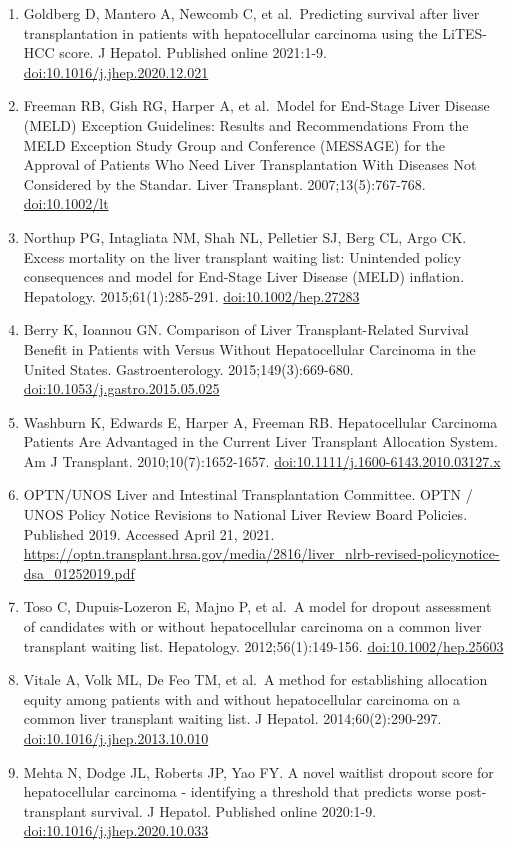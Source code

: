 \documentclass[11pt,english,]{book} %
\begin{document}
\begin{enumerate}
\item
  Goldberg D, Mantero A, Newcomb C, et al.~Predicting survival after liver transplantation in patients with hepatocellular carcinoma using the LiTES-HCC score. J Hepatol. Published online 2021:1-9. \url{doi:10.1016/j.jhep.2020.12.021}
\item
  Freeman RB, Gish RG, Harper A, et al.~Model for End-Stage Liver Disease (MELD) Exception Guidelines: Results and Recommendations From the MELD Exception Study Group and Conference (MESSAGE) for the Approval of Patients Who Need Liver Transplantation With Diseases Not Considered by the Standar. Liver Transplant. 2007;13(5):767-768. \url{doi:10.1002/lt}
\item
  Northup PG, Intagliata NM, Shah NL, Pelletier SJ, Berg CL, Argo CK. Excess mortality on the liver transplant waiting list: Unintended policy consequences and model for End-Stage Liver Disease (MELD) inflation. Hepatology. 2015;61(1):285-291. \url{doi:10.1002/hep.27283}
\item
  Berry K, Ioannou GN. Comparison of Liver Transplant-Related Survival Benefit in Patients with Versus Without Hepatocellular Carcinoma in the United States. Gastroenterology. 2015;149(3):669-680. \url{doi:10.1053/j.gastro.2015.05.025}
\item
  Washburn K, Edwards E, Harper A, Freeman RB. Hepatocellular Carcinoma Patients Are Advantaged in the Current Liver Transplant Allocation System. Am J Transplant. 2010;10(7):1652-1657. \url{doi:10.1111/j.1600-6143.2010.03127.x}
\item
  OPTN/UNOS Liver and Intestinal Transplantation Committee. OPTN / UNOS Policy Notice Revisions to National Liver Review Board Policies. Published 2019. Accessed April 21, 2021. \url{https://optn.transplant.hrsa.gov/media/2816/liver_nlrb-revised-policynotice-dsa_01252019.pdf}
\item
  Toso C, Dupuis-Lozeron E, Majno P, et al.~A model for dropout assessment of candidates with or without hepatocellular carcinoma on a common liver transplant waiting list. Hepatology. 2012;56(1):149-156. \url{doi:10.1002/hep.25603}
\item
  Vitale A, Volk ML, De Feo TM, et al.~A method for establishing allocation equity among patients with and without hepatocellular carcinoma on a common liver transplant waiting list. J Hepatol. 2014;60(2):290-297. \url{doi:10.1016/j.jhep.2013.10.010}
\item
  Mehta N, Dodge JL, Roberts JP, Yao FY. A novel waitlist dropout score for hepatocellular carcinoma - identifying a threshold that predicts worse post-transplant survival. J Hepatol. Published online 2020:1-9. \url{doi:10.1016/j.jhep.2020.10.033}

\end{enumerate}
\end{document}
